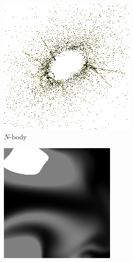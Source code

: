 \begin{figure}
\begin{subfigure}{0.24\textwidth}
    \includegraphics[width=\textwidth]{img/nbody.png}
    \caption{$N$-body}
    \label{fig:nbody}
  \end{subfigure}
  \begin{subfigure}{0.24\textwidth}
    \includegraphics[width=\textwidth]{img/fluid.png}

\end{subfigure}
\end{figure}

